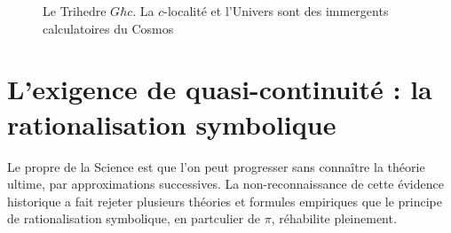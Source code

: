 \documentclass[a4paper,9pt]{article}
\newcounter{col}
\begin{document}
\begin{figure}
\label{tab:10:table10}
\centering
{}
\caption[The cG$\hbar$ Trihedra]{Le Trihedre $G\hbar c$.  La $c$-localité et l'Univers sont des immergents calculatoires du Cosmos}
\end{figure}






 
 
 
 



\section{L'exigence de quasi-continuité : la rationalisation symbolique}

Le propre de la Science est que l’on peut progresser sans connaître la théorie ultime, par approximations successives.  La non-reconnaissance de cette évidence historique a fait rejeter plusieurs théories et formules empiriques que le principe de rationalisation symbolique, en partculier de $\pi$, réhabilite pleinement. 
\end{document}

